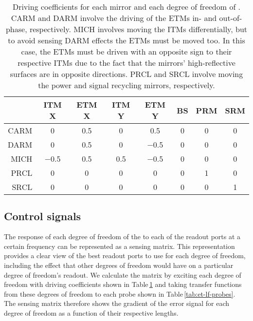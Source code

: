 \begin{table}
  \centering
  \begin{tabular}{r|ccccccc}
    & \textbf{\gls{ITM} X} & \textbf{\gls{ETM} X} & \textbf{\gls{ITM} Y} & \textbf{\gls{ETM} Y} & \textbf{\gls{BS}} & \textbf{\gls{PRM}} & \textbf{\gls{SRM}} \\
    \hline
    \gls{CARM} & \num{0} & \num{0.5} & \num{0} & \num{0.5} & \num{0} & \num{0} & \num{0} \\
    \gls{DARM} & \num{0} & \num{0.5} & \num{0} & \num{-0.5} & \num{0} & \num{0} & \num{0} \\
    \gls{MICH} & \num{-0.5} & \num{0.5} & \num{0.5} & \num{-0.5} & \num{0} & \num{0} & \num{0} \\
    \gls{PRCL} & \num{0} & \num{0} & \num{0} & \num{0} & \num{0} & \num{1} & \num{0} \\
    \gls{SRCL} & \num{0} & \num{0} & \num{0} & \num{0} & \num{0} & \num{0} & \num{1} \\
  \end{tabular}
  \caption[Driving coefficients for each mirror and each degree of freedom of \ETLF{}]{\label{tab:et-lf-driving-coefficients}Driving coefficients for each mirror and each degree of freedom of \ETLF{}. \gls{CARM} and \gls{DARM} involve the driving of the \glspl{ETM} in- and out-of-phase, respectively. \gls{MICH} involves moving the \glspl{ITM} differentially, but to avoid sensing \gls{DARM} effects the \glspl{ETM} must be moved too. In this case, the \glspl{ETM} must be driven with an opposite sign to their respective \glspl{ITM} due to the fact that the mirrors' high-reflective surfaces are in opposite directions. \gls{PRCL} and \gls{SRCL} involve moving the power and signal recycling mirrors, respectively.}
\end{table}

\subsection{Control signals}
The response of each degree of freedom of the \DRFPMI{} to each of the readout ports at a certain frequency can be represented as a sensing matrix. This representation provides a clear view of the best readout ports to use for each degree of freedom, including the effect that other degrees of freedom would have on a particular degree of freedom's readout. We calculate the matrix by exciting each degree of freedom with driving coefficients shown in Table\,\ref{tab:et-lf-driving-coefficients} and taking transfer functions from these degrees of freedom to each probe shown in Table\,\ref{tab:et-lf-probes}. The sensing matrix therefore shows the gradient of the error signal for each degree of freedom as a function of their respective lengths.

